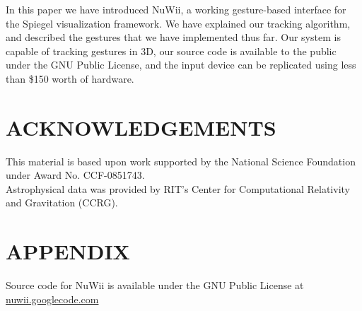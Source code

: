 \documentclass[a4paper,twoside]{article}
\begin{document}
    In this paper we have introduced NuWii, a working gesture-based interface
for the Spiegel visualization framework. We have explained our tracking
algorithm, and described the gestures that we have implemented thus far. Our
system is capable of tracking gestures in 3D, our source code is available to
the public under the GNU Public License, and the input device can be replicated
using less than \$150 worth of hardware. 
    
\section*{\uppercase{Acknowledgements}}     This material is based upon work
supported by the National Science Foundation under Award No. CCF-0851743.\\ 
Astrophysical data was provided by RIT's Center for Computational Relativity
and Gravitation (CCRG).

\renewcommand{\baselinestretch}{0.98}  {\small
} \renewcommand{\baselinestretch}{1}

\section*{\uppercase{Appendix}} Source code for NuWii is available under the
GNU Public License at \url{nuwii.googlecode.com} 
\end{document}
